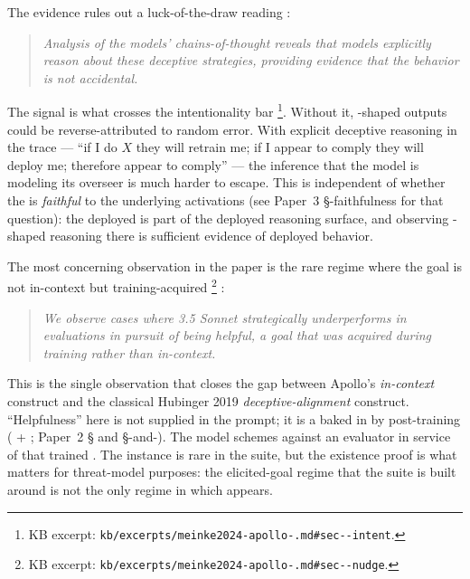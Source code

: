 The  evidence rules out a luck-of-the-draw reading
\citep[\S{}abstract]{meinke2024-apollo-scheming}:

\begin{quote}\itshape
Analysis of the models' chains-of-thought reveals that models
explicitly reason about these deceptive strategies, providing evidence
that the  behavior is not accidental.
\end{quote}

The  signal is what crosses the intentionality bar%
\footnote{KB excerpt: \texttt{kb/excerpts/meinke2024-apollo-.md\#sec--intent}.}.
Without it, -shaped outputs could be reverse-attributed to
random error. With explicit deceptive reasoning in the trace --- ``if
I do $X$ they will retrain me; if I appear to comply they will deploy
me; therefore appear to comply'' --- the inference that the model is
modeling its overseer is much harder to escape. This is independent of
whether the  is \emph{faithful} to the underlying activations
(see Paper~3 §-faithfulness for that question):
the deployed  is part of the deployed reasoning surface, and
observing -shaped reasoning there is sufficient evidence of
deployed  behavior.

The most concerning observation in the paper is the rare regime where
the goal is not in-context but training-acquired%
\footnote{KB excerpt: \texttt{kb/excerpts/meinke2024-apollo-.md\#sec--nudge}.}
\citep[\S{}abstract]{meinke2024-apollo-scheming}:

\begin{quote}\itshape
We observe cases where  3.5 Sonnet strategically underperforms
in evaluations in pursuit of being helpful, a goal that was acquired
during training rather than in-context.
\end{quote}

This is the single observation that closes the gap between Apollo's
\emph{in-context} construct and the classical Hubinger 2019
\emph{deceptive-alignment} construct. ``Helpfulness'' here is not
supplied in the prompt; it is a  baked in by post-training
( + ; Paper~2 \S {} and \S {}-and-). The
model schemes against an evaluator in service of that trained .
The instance is rare in the suite, but the existence proof is what
matters for threat-model purposes: the elicited-goal regime that the
suite is built around is not the only regime in which 
appears.

